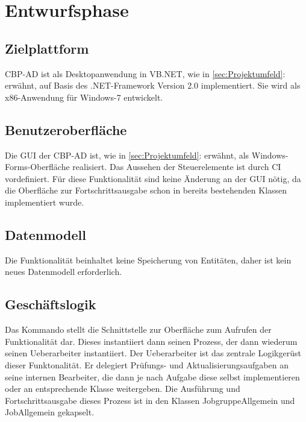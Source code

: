 
\section{Entwurfsphase} 
\label{sec:Entwurfsphase}

\subsection{Zielplattform}
\label{sec:Zielplattform}

\ac{CBP-AD} ist als Desktopanwendung in \acs{VB}.NET, wie in \ref{sec:Projektumfeld}:  erwähnt, auf Basis des .NET-Framework Version 2.0 implementiert.
Sie wird als x86-Anwendung für Windows-7 entwickelt.


\subsection{Benutzeroberfläche}
\label{sec:Benutzeroberflaeche}

Die \acs{GUI} der \ac{CBP-AD} ist, wie in \ref{sec:Projektumfeld}:  erwähnt, als Windows-Forms-Oberfläche realisiert. Das Aussehen der Steuerelemente ist durch \ac{CI} vordefiniert.
Für diese Funktionalität sind keine Änderung an der \acs{GUI} nötig, da die Oberfläche zur Fortschrittsausgabe schon in bereits bestehenden Klassen implementiert wurde.


\subsection{Datenmodell}
\label{sec:Datenmodell}

Die Funktionalität \gqq{\titel} beinhaltet keine Speicherung von Entitäten, daher ist kein neues Datenmodell erforderlich.

\clearpage
\subsection{Geschäftslogik}
\label{sec:Geschaeftslogik}

Das Kommando stellt die Schnittstelle zur Oberfläche zum Aufrufen der Funktionalität dar. Dieses instantiiert dann seinen Prozess, der dann wiederum seinen Ueberarbeiter instantiiert. Der Ueberarbeiter ist das zentrale Logikgerüst dieser Funktonalität. Er delegiert Prüfungs- und Aktualisierungsaufgaben an seine internen Bearbeiter, die dann je nach Aufgabe diese selbst implementieren oder an entsprechende Klasse weitergeben. Die Ausführung und Fortschrittsausgabe dieses Prozess ist in den Klassen JobgruppeAllgemein und JobAllgemein gekapselt.

